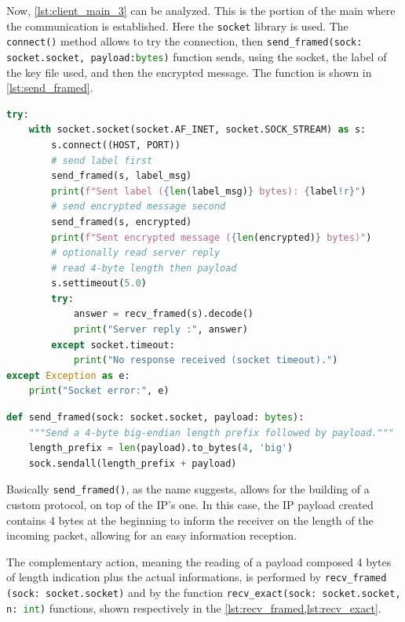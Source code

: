 Now, \cref{lst:client_main_3} can be analyzed. This is the portion of
the main where the
communication is established.
Here the \lstinline[language=python]|socket| library is used. The
\lstinline[language=python]|connect()| method allows to try the connection, then
\lstinline[language=python]|send_framed(sock: socket.socket, payload:bytes)|
function sends, using the
socket, the label of the key file used, and then the encrypted
message. The function is
shown in \cref{lst:send_framed}.

\begin{lstlisting}[basicstyle=\ttfamily\footnotesize, language=python, caption=Client script (part 3)., label=lst:client_main_3, float=h]
try:
    with socket.socket(socket.AF_INET, socket.SOCK_STREAM) as s:
        s.connect((HOST, PORT))
        # send label first
        send_framed(s, label_msg)
        print(f"Sent label ({len(label_msg)} bytes): {label!r}")
        # send encrypted message second
        send_framed(s, encrypted)
        print(f"Sent encrypted message ({len(encrypted)} bytes)")
        # optionally read server reply
        # read 4-byte length then payload
        s.settimeout(5.0)
        try:
            answer = recv_framed(s).decode()
            print("Server reply :", answer)
        except socket.timeout:
            print("No response received (socket timeout).")
except Exception as e:
    print("Socket error:", e)
\end{lstlisting}

\begin{lstlisting}[basicstyle=\ttfamily\footnotesize, language=python, caption=Function sending a payload and its length as an header., label=lst:send_framed, float=h]
  def send_framed(sock: socket.socket, payload: bytes):
    """Send a 4-byte big-endian length prefix followed by payload."""
    length_prefix = len(payload).to_bytes(4, 'big')
    sock.sendall(length_prefix + payload)
\end{lstlisting}

Basically \lstinline[language=python]|send_framed()|, as the name suggests,
allows for the building of a custom protocol, on top of the IP's one.
In this case, the IP payload created
contains 4 bytes at the beginning to inform the receiver on the
length of the incoming packet,
allowing for an easy information reception.

The complementary action, meaning the reading of a payload composed 4
bytes of length indication plus
the actual informations, is performed by \newline
\lstinline[language=python]|recv_framed (sock: socket.socket)| and by
the function
\lstinline[language=python]|recv_exact(sock: socket.socket, n: int)|
functions, shown
respectively in the \cref{lst:recv_framed,lst:recv_exact}.

